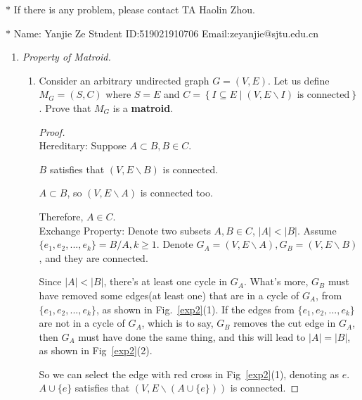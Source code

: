 \documentclass[12pt,a4paper]{article}
\theoremstyle{definition}
\begin{document}
\noindent

\noindent{}
\begin{center}
\footnotesize{\color{red}$*$ If there is any problem, please contact TA Haolin Zhou.}

\footnotesize{\color{blue}$*$ Name: Yanjie Ze  \quad Student ID:519021910706 \quad Email:zeyanjie@sjtu.edu.cn}
\end{center}
\begin{enumerate}
\item \textit{Property of Matroid.} 
\begin{enumerate}
	\item
	Consider an arbitrary undirected graph $ G=(V,E) $. Let us define $ M_{G}=(S,C) $ where $ S=E $ and $ C=\left\{I \subseteq E \mid\left(V, E \backslash I\right) \text { is connected}\right\} $. Prove that $ M_{G} $ is a \textbf{matroid}.\par
	    \begin{proof}
	    ~\\
{\color{blue}Hereditary}: Suppose $A\subset B, B\in C$.

$B$ satisfies that $(V, E\backslash B)$ is connected.

$A\subset B$, so $(V, E\backslash A)$ is connected too.

Therefore, $A\in C$.
~\\

{\color{blue}Exchange Property}: Denote two subsets $A, B\in C$, $|A| < |B|$. Assume $\{e_1,e_2,...,e_k\}=B/A,k\geq 1$. Denote $G_A = (V, E\backslash A), G_B = (V, E\backslash B)$, and they are connected. 

Since $|A|<|B|$, there's at least one cycle in $G_A$. What's more, $G_B$ must have removed some edges(at least one) that are in a cycle of $G_A$, from $\{e_1,e_2,...,e_k\}$, as shown in Fig.~\ref{exp2}(1). If the edges from $\{e_1,e_2,...,e_k\}$ are not in a cycle of $G_A$, which is to say, $G_B$ removes the cut edge in $G_A$, then $G_A$ must have done the same thing, and this will lead to $|A|=|B|$, as shown in Fig~\ref{exp2}(2).

So we can select the edge with {\color{red}red cross} in Fig~\ref{exp2}(1), denoting as $e$. $A\cup \{e\}$ satisfies that $(V,E\backslash (A\cup \{e\}))$ is connected.


\end{proof}
\end{enumerate}
\end{enumerate}
\end{document}
